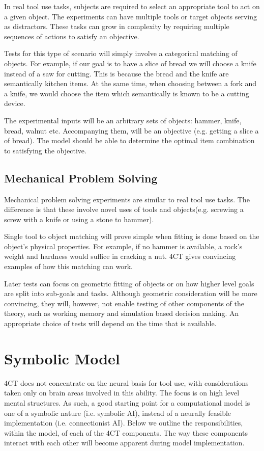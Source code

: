 \documentclass[11]{article}
\begin{document}
In real tool use tasks, subjects are required to select an appropriate tool to act on a given object\cite{baumard2014}. The experiments can have multiple tools or target objects serving as distractors. These tasks can grow in complexity by requiring multiple sequences of actions to satisfy an objective.

Tests for this type of scenario will simply involve a categorical matching of objects. For example, if our goal is to have a slice of bread we will choose a knife instead of a saw for cutting. This is because the bread and the knife are semantically kitchen items. At the same time, when choosing between a fork and a knife, we would choose the item which semantically is known to be a cutting device. 

The experimental inputs will be an arbitrary sets of objects: hammer, knife, bread, walnut etc. Accompanying them, will be an objective (e.g. getting a slice a of bread). The model should be able to determine the optimal item combination to satisfying the objective. 

\subsection{Mechanical Problem Solving}

Mechanical problem solving experiments are similar to real tool use tasks. The difference is that these involve novel uses of tools and objects(e.g. screwing a screw with a knife\cite{baumard2014} or using a stone to hammer\cite{zhu2015}). 

Single tool to object matching will prove simple when fitting is done based on the object's physical properties. For example, if no hammer is available, a rock's weight and hardness would suffice in cracking a nut. 4CT gives convincing examples of how this matching can work. 

Later tests can focus on geometric fitting of objects or on how higher level goals are split into sub-goals and tasks. Although geometric consideration will be more convincing, they will, however, not enable testing of other components of the theory, such as working memory and simulation based decision making. An appropriate choice of tests will depend on the time that is available. 

\section{Symbolic Model}

4CT does not concentrate on the neural basis for tool use, with considerations taken only on brain areas involved in this ability. The focus is on high level mental structures. As such, a good starting point for a computational model is one of a symbolic nature (i.e. symbolic AI), instead of a neurally feasible implementation (i.e. connectionist AI)\cite{smolensky87}. Below we outline the responsibilities, within the model, of each of the 4CT components. The way these components interact with each other will become apparent during model implementation.
\end{document}
